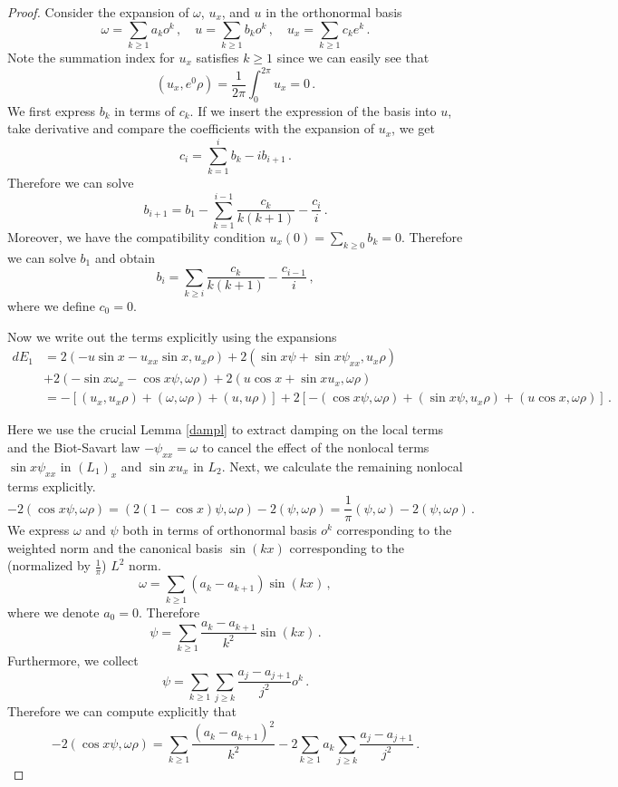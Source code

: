 \documentclass[12pt]{caltech_thesis}
\numberwithin{equation}{section}
\begin{document}
\begin{proof}
Consider the expansion of $\omega$, $u_x$, and $u$ in the orthonormal basis
$$\omega=\sum_{k\geq 1} a_k o^k\,, \quad u=\sum_{k\geq 1} b_k o^k\,, \quad u_x=\sum_{k\geq1} c_k e^k\,.$$
Note the summation index for $u_x$ satisfies $k \geq 1$ since we can easily see that $$ (u_x,e^0\rho)=\frac{1}{2\pi}\int_0^{2\pi} u_x=0\,.$$We first express $b_k$ in terms of $c_k$. If we insert the expression of the basis into $u$, take derivative and compare the coefficients with the expansion of $u_x$, we get $$c_i=\sum_{k=1}^i b_k-ib_{i+1}\,.$$
Therefore we can solve $$b_{i+1}=b_1-\sum_{k=1}^{i-1}\frac{c_k}{k(k+1)}-\frac{c_{i}}{i}\,.$$
Moreover, we have the compatibility condition $u_x(0)=\sum_{k \geq 0} b_k=0$. Therefore we can solve $b_1$ and obtain 
\begin{equation}\label{bc}
    b_{i}=\sum_{k\geq i}\frac{c_k}{k(k+1)}-\frac{c_{i-1}}{i}\,,
\end{equation}
where we define $c_0=0$.

Now we write out the terms explicitly using the expansions
\begin{equation*}
\begin{aligned}
dE_1&=2(-u\sin x-u_{xx}\sin x,u_x\rho)+2(\sin x\psi+\sin x\psi_{xx},u_x\rho)\\&+2(- \sin x \omega_x- \cos x\psi,\omega \rho) +2 (u \cos{x}+\sin x u_x,\omega \rho)\\&=-[(u_x,u_x\rho)+(\omega,\omega\rho)+(u,u\rho)]+2[-( \cos x\psi,\omega \rho)+(\sin x\psi,u_x\rho)+ (u \cos{x},\omega \rho)]\,.    
\end{aligned}    
\end{equation*}

Here we use the crucial Lemma \ref{dampl} to extract damping on the local terms and the Biot-Savart law $-\psi_{xx}=\omega$ to cancel the effect of the nonlocal terms {$\sin x\psi_{xx}$ in $(L_1)_x$ and $\sin xu_{x}$ in $L_2$}. Next, we calculate the remaining nonlocal terms explicitly.
$$-2( \cos x\psi,\omega \rho)=(2(1-\cos x)\psi,\omega \rho)-2(\psi,\omega \rho)=\frac{1}{\pi}(\psi,\omega)-2(\psi,\omega \rho)\,.$$
We express $\omega$ and $\psi$ both in terms of orthonormal basis $o^k$ corresponding to the weighted norm and the canonical basis $\sin(kx)$ corresponding to the (normalized by $\frac{1}{\pi}$) $L^2$ norm.
$$\omega=\sum_{k \geq 1} (a_k-a_{k+1}) \sin(kx)\,,$$
where we denote $a_0=0$. Therefore 
$$\psi=\sum_{k \geq 1} \frac{a_k-a_{k+1}}{k^2} \sin(kx)\,.$$
Furthermore, we collect
$$\psi=\sum_{k\geq 1} \sum_{j\geq k}\frac{a_j-a_{j+1}}{j^2} o^k\,.$$
Therefore we can compute explicitly that 
$$-2( \cos x\psi,\omega \rho)=\sum_{k \geq 1} \frac{(a_k-a_{k+1})^2}{k^2}-2\sum_{k\geq 1} a_k\sum_{j\geq k}\frac{a_j-a_{j+1}}{j^2}\,.$$


\end{proof}
\end{document}
